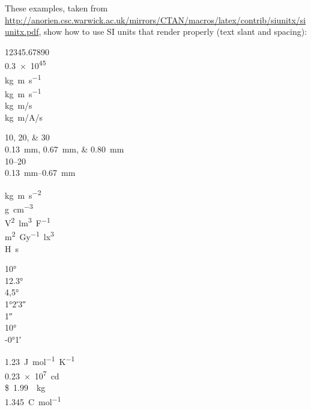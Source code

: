 \documentclass[10pt,\jkfside,a4paper]{article}
\begin{document}
These examples, taken from \url{http://anorien.csc.warwick.ac.uk/mirrors/CTAN/macros/latex/contrib/siunitx/siunitx.pdf}, show how to use SI units that render properly (text slant and spacing):

\num{12345,67890} \\
\num{.3e45} \\

\si{kg.m.s^{-1}} \\
\si{\kilogram\metre\per\second} \\
\si[per-mode=symbol]
{\kilogram\metre\per\second} \\
\si[per-mode=symbol]{\kilogram\metre\per\ampere\per\second}

\numlist{10;20;30} \\
\SIlist{0.13;0.67;0.80}{\milli\metre} \\
\numrange{10}{20} \\
\SIrange{0.13}{0.67}{\milli\metre}

\si{\kilo\gram\metre\per\square\second} \\
\si{\gram\per\cubic\centi\metre} \\
\si{\square\volt\cubic\lumen\per\farad} \\
\si{\metre\squared\per\gray\cubic\lux} \\
\si{\henry\second}

\ang{10} \\
\ang{12.3} \\
\ang{4,5} \\
\ang{1;2;3} \\
\ang{;;1} \\
\ang{+10;;} \\
\ang{-0;1;}

\SI[mode=text]{1.23}{J.mol^{-1}.K^{-1}} \\
\SI{.23e7}{\candela} \\
\SI[per-mode=symbol]{1.99}[\$]{\per\kilogram} \\
\SI[per-mode=fraction]{1,345}{\coulomb\per\mole}
\end{document}
